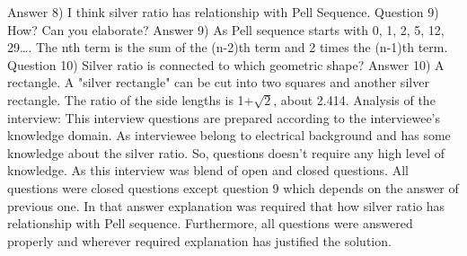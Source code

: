 \documentclass[12pt]{article}
\begin{document}
{Answer 8) I think silver ratio has relationship with Pell Sequence.
\newline
\newline
Question 9) How? Can you elaborate?
\newline
Answer 9) As Pell sequence starts with 0, 1, 2, 5, 12, 29…. The nth term is the sum of the (n-2)th term and 2 times the (n-1)th term.
\newline
\newline
Question 10) Silver ratio is connected to which geometric shape?
\newline
Answer 10) A rectangle. A "silver rectangle" can be cut into two squares and another silver rectangle. The ratio of the side lengths is 1+$\sqrt{2}$, about 2.414.
\newline
\newline
Analysis of the interview:
\newline
This interview questions are prepared according to the interviewee's knowledge domain. As interviewee belong to electrical background and has some knowledge about the silver ratio. So, questions doesn't require any high level of knowledge.
\newline
As this interview was blend of open and closed questions. All questions were closed questions except question 9 which depends on the answer of previous one. In that answer explanation was required that how silver ratio has relationship with Pell sequence.
Furthermore, all questions were answered properly and wherever required explanation has justified the solution.



\newpage
}
\end{document}
